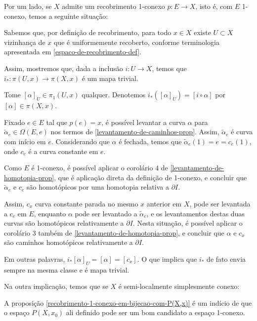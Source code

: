 \begin{dem}
    Por um lado, se $X$ admite um recobrimento 1-conexo $p:E\rightarrow X$, isto é, com $E$ 1-conexo, temos a seguinte situação:\newline

    Sabemos que, por definição de recobrimento, para todo $x\in X$ existe $U\subset X$ vizinhança de $x$ que é uniformemente recoberto, conforme terminologia apresentada em \ref{espaco-de-recobrimento-def}.

    Assim, mostremos que, dada a inclusão $i:U\rightarrow X$, temos que $i_*:\pi(U,x)\rightarrow \pi(X,x)$ é um mapa trivial.

    Tome $[\alpha]_U \in \pi_1(U,x)$ qualquer. Denotemos $i_*([\alpha]_U)=[i\circ \alpha]$ por $[\alpha]\in \pi(X,x)$.

    Fixado $e\in E$ tal que $p(e)=x$, é possível levantar a curva $\alpha$ para $\tilde{\alpha}_e\in \Omega (E,e)$ nos termos de \ref{levantamento-de-caminhos-prop}. Assim, $\tilde{\alpha}_e$ é  curva com início em $e$. Considerando que $\alpha$ é fechada, temos que $\tilde{\alpha}_e(1)=e=c_e(1)$, onde $c_e$ é a curva constante em $e$.

    Como $E$ é 1-conexo, é possível aplicar o corolário 4 de \ref{levantamento-de-homotopia-prop}, que é aplicação direta da definição de 1-conexo, e concluir que $\tilde{\alpha}_e$ e $c_e$ são homotópicos por uma homotopia relativa a $\partial I$.
    
    Assim, $c_x$ curva constante parada no mesmo $x$ anterior em $X$, pode ser levantada a $c_e$ em $E$, enquanto $\alpha$ pode ser levantado a $\tilde{\alpha}_e$, e os levantamentos destas duas curvas são homotópicos relativamente a $\partial I$. Nesta situação, é possível aplicar o corolário 3 também de \ref{levantamento-de-homotopia-prop}, e concluir que $\alpha$ e $c_x$ são caminhos homotópicos relativamente a $\partial I$.

    Em outras palavras, $i_*[\alpha]_U=[\alpha]=[c_x]$. O que implica que $i_*$ de fato envia sempre na mesma classe e é mapa trivial.\newline\newline




    Na outra implicação, temos que se $X$ é semi-localmente simplesmente conexo:\newline
    
    A proposição \ref{recobrimento-1-conexo-em-bijecao-com-P(X,x)} é um indício de que o espaço $P(X,x_0)$ ali definido pode ser um bom candidato a espaço 1-conexo.


\end{dem}
